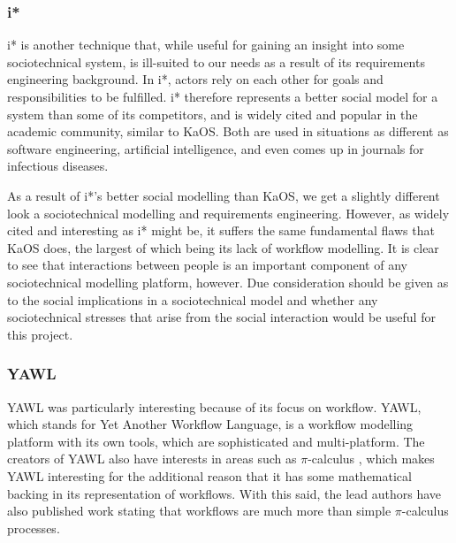 \documentclass{sig-alternate}
\newcommand{\picalc}{\(\pi\)-calculus }
\begin{document}
\subsubsection{i*} %
\label{research_istar}
i* is another technique that, while useful for gaining an insight into some sociotechnical system, is ill-suited to our needs as a result of its requirements engineering background\cite{Werneck2009}. In i*, actors rely on each other for goals and responsibilities to be fulfilled. i* therefore represents a better social model for a system than some of its competitors, and is widely cited and popular in the academic community, similar to KaOS. Both are used in situations as different as software engineering\cite{Almisned2010}, artificial intelligence\cite{VanDiggelen2010}, and even comes up in journals for infectious diseases\cite{Tutorial2007}. \par
As a result of i*'s better social modelling than KaOS, we get a slightly different look a sociotechnical modelling and requirements engineering. However, as widely cited and interesting as i* might be, it suffers the same fundamental flaws that KaOS does, the largest of which being its lack of workflow modelling. It is clear to see that interactions between people is an important component of any sociotechnical modelling platform, however. Due consideration should be given as to the social implications in a sociotechnical model and whether any sociotechnical stresses that arise from the social interaction would be useful for this project. \par

\subsubsection{YAWL} %
YAWL was particularly interesting because of its focus on workflow. YAWL, which stands for Yet Another Workflow Language\cite{hofstede2010yawl}, is a workflow modelling platform with its own tools, which are sophisticated and multi-platform. The creators of YAWL also have interests in areas such as \picalc\cite{Aalst2004}, which makes YAWL interesting for the additional reason that it has some mathematical backing in its representation of workflows. With this said, the lead authors have also published work stating that workflows are much more than simple \picalc processes\cite{Aalst2004}. \par
\end{document}

